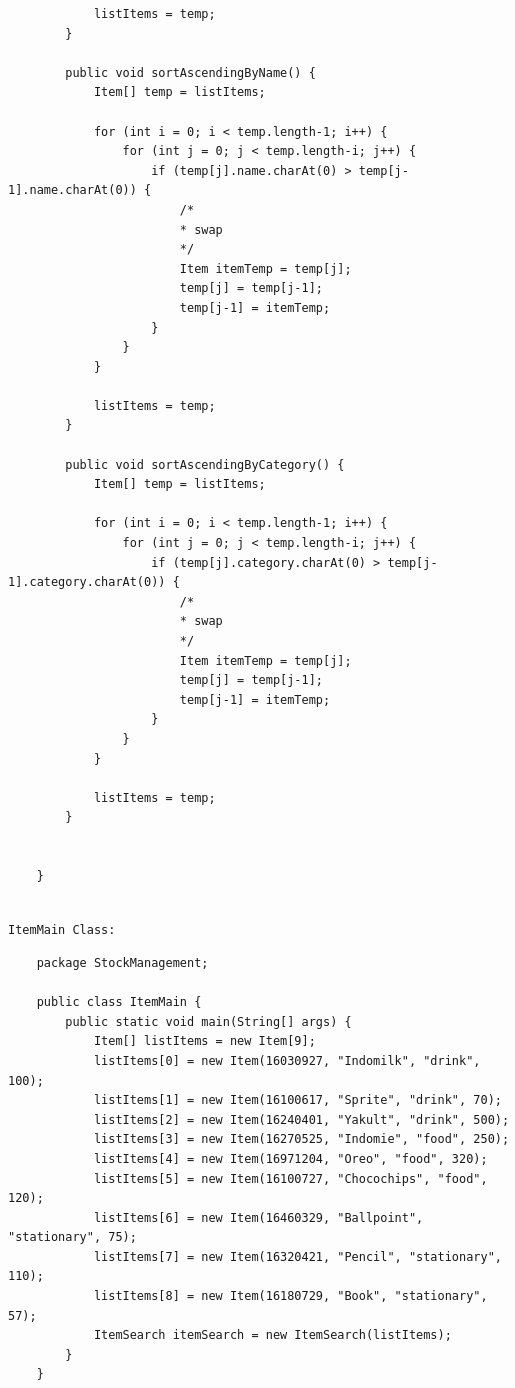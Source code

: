 \documentclass[12pt,titlepage]{article}
\begin{document}
\begin{verbatim}
            listItems = temp;
        }
        
        public void sortAscendingByName() {
            Item[] temp = listItems;
            
            for (int i = 0; i < temp.length-1; i++) {
                for (int j = 0; j < temp.length-i; j++) {
                    if (temp[j].name.charAt(0) > temp[j-1].name.charAt(0)) {
                        /*
                        * swap
                        */
                        Item itemTemp = temp[j];
                        temp[j] = temp[j-1];
                        temp[j-1] = itemTemp;
                    }
                }
            }

            listItems = temp;
        }
        
        public void sortAscendingByCategory() {
            Item[] temp = listItems;
            
            for (int i = 0; i < temp.length-1; i++) {
                for (int j = 0; j < temp.length-i; j++) {
                    if (temp[j].category.charAt(0) > temp[j-1].category.charAt(0)) {
                        /*
                        * swap
                        */
                        Item itemTemp = temp[j];
                        temp[j] = temp[j-1];
                        temp[j-1] = itemTemp;
                    }
                }
            }

            listItems = temp;
        }


    }
\end{verbatim}

\mbox{}\\
\texttt{ItemMain Class:}
\mbox{}\\

\begin{verbatim}
    package StockManagement;

    public class ItemMain {
        public static void main(String[] args) {
            Item[] listItems = new Item[9];
            listItems[0] = new Item(16030927, "Indomilk", "drink", 100);
            listItems[1] = new Item(16100617, "Sprite", "drink", 70);
            listItems[2] = new Item(16240401, "Yakult", "drink", 500);
            listItems[3] = new Item(16270525, "Indomie", "food", 250);
            listItems[4] = new Item(16971204, "Oreo", "food", 320);
            listItems[5] = new Item(16100727, "Chocochips", "food", 120);
            listItems[6] = new Item(16460329, "Ballpoint", "stationary", 75);
            listItems[7] = new Item(16320421, "Pencil", "stationary", 110);
            listItems[8] = new Item(16180729, "Book", "stationary", 57);
            ItemSearch itemSearch = new ItemSearch(listItems);
        }
    }
\end{verbatim}
\end{document}
